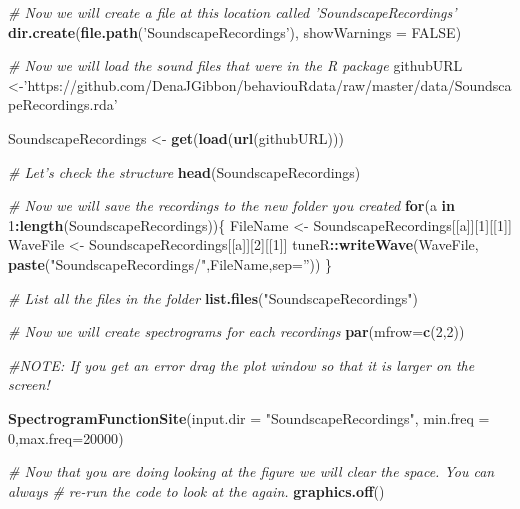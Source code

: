 \documentclass[]{book}
\newenvironment{Shaded}{\begin{snugshade}}{\end{snugshade}}
\newcommand{\CommentTok}[1]{\textcolor[rgb]{0.56,0.35,0.01}{\textit{#1}}}
\newcommand{\ControlFlowTok}[1]{\textcolor[rgb]{0.13,0.29,0.53}{\textbf{#1}}}
\newcommand{\DataTypeTok}[1]{\textcolor[rgb]{0.13,0.29,0.53}{#1}}
\newcommand{\DecValTok}[1]{\textcolor[rgb]{0.00,0.00,0.81}{#1}}
\newcommand{\KeywordTok}[1]{\textcolor[rgb]{0.13,0.29,0.53}{\textbf{#1}}}
\newcommand{\NormalTok}[1]{#1}
\newcommand{\OperatorTok}[1]{\textcolor[rgb]{0.81,0.36,0.00}{\textbf{#1}}}
\newcommand{\OtherTok}[1]{\textcolor[rgb]{0.56,0.35,0.01}{#1}}
\newcommand{\StringTok}[1]{\textcolor[rgb]{0.31,0.60,0.02}{#1}}
\begin{document}
\begin{Shaded}
\begin{Highlighting}[]
\CommentTok{# Now we will create a file at this location called 'SoundscapeRecordings'}
\KeywordTok{dir.create}\NormalTok{(}\KeywordTok{file.path}\NormalTok{(}\StringTok{'SoundscapeRecordings'}\NormalTok{), }\DataTypeTok{showWarnings =} \OtherTok{FALSE}\NormalTok{)}

\CommentTok{# Now we will load the sound files that were in the R package}
\NormalTok{githubURL <-}\StringTok{'https://github.com/DenaJGibbon/behaviouRdata/raw/master/data/SoundscapeRecordings.rda'}

\NormalTok{SoundscapeRecordings <-}\StringTok{ }\KeywordTok{get}\NormalTok{(}\KeywordTok{load}\NormalTok{(}\KeywordTok{url}\NormalTok{(githubURL)))}

\CommentTok{# Let's check the structure}
\KeywordTok{head}\NormalTok{(SoundscapeRecordings)}

\CommentTok{# Now we will save the recordings to the new folder you created}
\ControlFlowTok{for}\NormalTok{(a }\ControlFlowTok{in} \DecValTok{1}\OperatorTok{:}\KeywordTok{length}\NormalTok{(SoundscapeRecordings))\{}
\NormalTok{  FileName <-}\StringTok{ }\NormalTok{SoundscapeRecordings[[a]][}\DecValTok{1}\NormalTok{][[}\DecValTok{1}\NormalTok{]]}
\NormalTok{  WaveFile <-}\StringTok{ }\NormalTok{SoundscapeRecordings[[a]][}\DecValTok{2}\NormalTok{][[}\DecValTok{1}\NormalTok{]]}
\NormalTok{  tuneR}\OperatorTok{::}\KeywordTok{writeWave}\NormalTok{(WaveFile, }\KeywordTok{paste}\NormalTok{(}\StringTok{"SoundscapeRecordings/"}\NormalTok{,FileName,}\DataTypeTok{sep=}\StringTok{''}\NormalTok{))}
\NormalTok{\}}

\CommentTok{# List all the files in the folder}
\KeywordTok{list.files}\NormalTok{(}\StringTok{"SoundscapeRecordings"}\NormalTok{)}

\CommentTok{# Now we will create spectrograms for each recordings}
\KeywordTok{par}\NormalTok{(}\DataTypeTok{mfrow=}\KeywordTok{c}\NormalTok{(}\DecValTok{2}\NormalTok{,}\DecValTok{2}\NormalTok{))}

\CommentTok{#NOTE: If you get an error drag the plot window so that it is larger on the screen!}

\KeywordTok{SpectrogramFunctionSite}\NormalTok{(}\DataTypeTok{input.dir =} \StringTok{"SoundscapeRecordings"}\NormalTok{,}
                    \DataTypeTok{min.freq =} \DecValTok{0}\NormalTok{,}\DataTypeTok{max.freq=}\DecValTok{20000}\NormalTok{)}

\CommentTok{# Now that you are doing looking at the figure we will clear the space. You can always}
\CommentTok{# re-run the code to look at the again.}
\KeywordTok{graphics.off}\NormalTok{()}


\end{Highlighting}
\end{Shaded}
\end{document}
